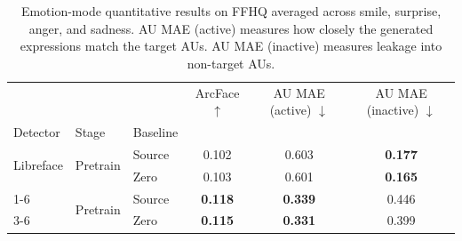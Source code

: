\begin{table}[htb]
\caption{Emotion-mode quantitative results on FFHQ averaged across smile, surprise, anger, and sadness. AU MAE (active) measures how closely the generated expressions match the target \acp{AU}. AU MAE (inactive) measures leakage into non-target \acp{AU}.}
\label{tab:results-emotion-ffhq}
\begin{tabular}{lllccc}
\toprule
 &  &  & ArcFace $\uparrow$ & AU MAE (active) $\downarrow$ & AU MAE (inactive) $\downarrow$ \\
Detector & Stage & Baseline &  &  &  \\
\midrule
\multirow[t]{2}{*}{Libreface} & \multirow[t]{2}{*}{Pretrain} & Source & 0.102 & 0.603 & \textbf{0.177} \\
\cmidrule{3-6}
 &  & Zero & 0.103 & 0.601 & \textbf{0.165} \\
\cmidrule{1-6}
\multirow[t]{2}{*}{Pyfeat} & \multirow[t]{2}{*}{Pretrain} & Source & \textbf{0.118} & \textbf{0.339} & 0.446 \\
\cmidrule{3-6}
 &  & Zero & \textbf{0.115} & \textbf{0.331} & 0.399 \\
\bottomrule
\end{tabular}
\end{table}
